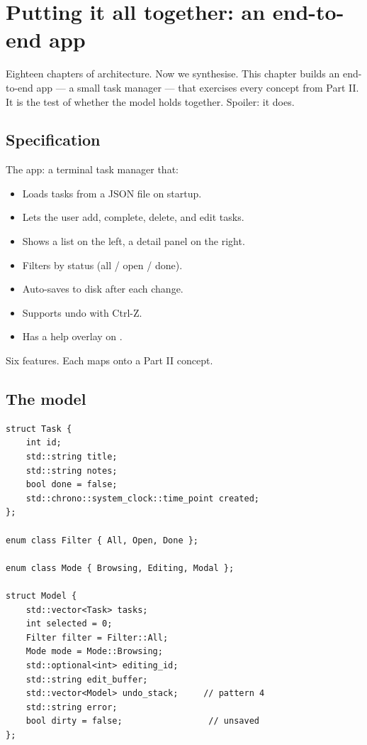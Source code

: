 \chapter{Putting it all together: an end-to-end app}
\label{ch:end-to-end}

\begin{aside}
Eighteen chapters of architecture. Now we synthesise. This
chapter builds an end-to-end app --- a small task manager ---
that exercises every concept from Part II. It is the test of
whether the model holds together. Spoiler: it does.
\end{aside}

\section{Specification}

The app: a terminal task manager that:

\begin{itemize}[leftmargin=*]
  \item Loads tasks from a JSON file on startup.
  \item Lets the user add, complete, delete, and edit tasks.
  \item Shows a list on the left, a detail panel on the right.
  \item Filters by status (all / open / done).
  \item Auto-saves to disk after each change.
  \item Supports undo with Ctrl-Z.
  \item Has a help overlay on .
\end{itemize}

Six features. Each maps onto a Part II concept.

\section{The model}

\begin{lstlisting}
struct Task {
    int id;
    std::string title;
    std::string notes;
    bool done = false;
    std::chrono::system_clock::time_point created;
};

enum class Filter { All, Open, Done };

enum class Mode { Browsing, Editing, Modal };

struct Model {
    std::vector<Task> tasks;
    int selected = 0;
    Filter filter = Filter::All;
    Mode mode = Mode::Browsing;
    std::optional<int> editing_id;
    std::string edit_buffer;
    std::vector<Model> undo_stack;     // pattern 4
    std::string error;
    bool dirty = false;                 // unsaved
};
\end{lstlisting}

